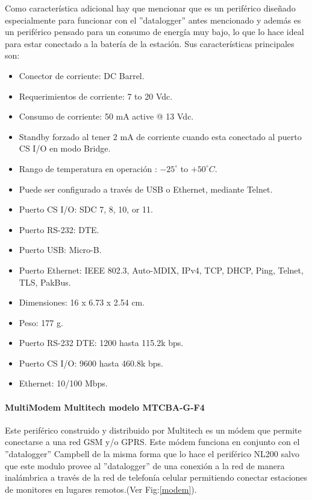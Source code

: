 Como característica adicional hay que mencionar que es un periférico diseñado especialmente para funcionar con el ''datalogger'' antes mencionado y además es un periférico pensado para un consumo de energía muy bajo, lo que lo hace ideal para estar conectado a la batería de la estación. Sus características principales son:

\begin{itemize}
\item Conector de corriente: DC Barrel.
\item Requerimientos de corriente: 7 to 20 Vdc. 
\item Consumo de corriente: 50 mA active @ 13 Vdc.
\item Standby forzado al tener 2 mA de corriente cuando esta conectado al puerto CS I/O en modo Bridge.
\item Rango de temperatura en operación : ${-25}^{\circ}$ to ${+50}^{\circ}C$.
\item Puede ser configurado a través de USB o Ethernet, mediante Telnet.
\item Puerto CS I/O: SDC 7, 8, 10, or 11.
\item Puerto RS-232: DTE.
\item Puerto USB: Micro-B.
\item Puerto Ethernet: IEEE 802.3, Auto-MDIX, IPv4, TCP, DHCP, Ping, Telnet, TLS, PakBus.
\item Dimensiones: 16 x 6.73 x 2.54 cm.
\item Peso: 177 g.
\item Puerto RS-232 DTE: 1200 hasta 115.2k bps.
\item Puerto CS I/O: 9600 hasta 460.8k bps.
\item Ethernet: 10/100 Mbps.
\end{itemize}

\paragraph{MultiModem Multitech modelo MTCBA-G-F4}
Este periférico construido y distribuido por Multitech\cite{hardware:multitech} es un módem que permite conectarse a una red GSM y/o GPRS. Este módem funciona en conjunto con el ''datalogger'' Campbell de la misma forma que lo hace el periférico NL200 salvo que este modulo provee al ''datalogger'' de una conexión a la red de manera inalámbrica a través de la red de telefonía celular permitiendo conectar estaciones de monitores en lugares remotos.(Ver Fig:\ref{modem}).\\

